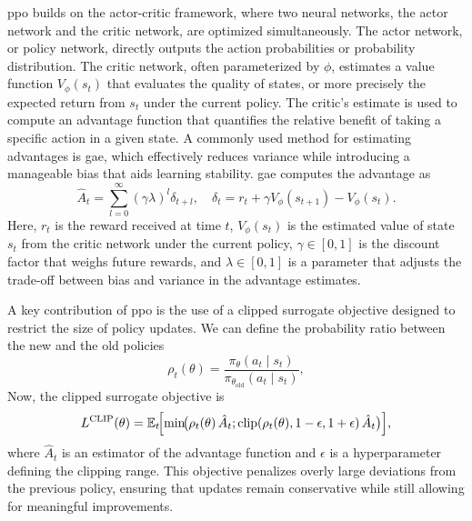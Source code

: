 \gls{ppo} builds on the actor-critic framework, where two neural networks, the actor network and the critic network, are optimized simultaneously. The actor network, or policy network, directly outputs the action probabilities or probability distribution. The critic network, often parameterized by \(\phi\), estimates a value function \(V_\phi(s_t)\) that evaluates the quality of states, or more precisely the expected return from \(s_t\) under the current policy. The critic's estimate is used to compute an advantage function that quantifies the relative benefit of taking a specific action in a given state. A commonly used method for estimating advantages is \gls{gae}, which effectively reduces variance while introducing a manageable bias that aids learning stability. \gls{gae} computes the advantage as
\begin{equation}
\hat{A}_t = \sum_{l=0}^{\infty} (\gamma \lambda)^l \delta_{t+l}, 
\quad
\delta_t = r_t + \gamma V_\phi(s_{t+1}) - V_\phi(s_t).
\end{equation}
Here, \(r_t\) is the reward received at time \(t\), \(V_\phi(s_t)\) is the estimated value of state \(s_t\) from the critic network under the current policy, \(\gamma \in [0,1]\) is the discount factor that weighs future rewards, and \(\lambda \in [0,1]\) is a parameter that adjusts the trade-off between bias and variance in the advantage estimates.

A key contribution of \gls{ppo} is the use of a clipped surrogate objective designed to restrict the size of policy updates. We can define the probability ratio between the new and the old policies
\begin{equation}
\rho_t(\theta) = \frac{\pi_\theta(a_t\mid s_t)}{\pi_{\theta_{\text{old}}}(a_t\mid s_t)},
\end{equation}
Now, the clipped surrogate objective is
\begin{equation}
L^{\text{CLIP}}(\theta) = \mathbb{E}_t\!\Bigl[\min\!\bigl(\rho_t(\theta)\,\hat{A}_t;\text{clip}(\rho_t(\theta),1-\epsilon,1+\epsilon)\,\hat{A}_t\bigr)\Bigr],
\end{equation}
where \(\hat{A}_t\) is an estimator of the advantage function and \(\epsilon\) is a hyperparameter defining the clipping range. This objective penalizes overly large deviations from the previous policy, ensuring that updates remain conservative while still allowing for meaningful improvements.

